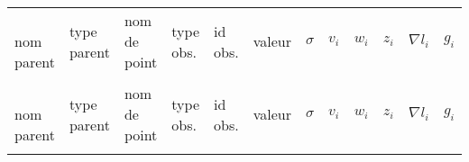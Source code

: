 \documentclass[a4paper, 9pt]{report}
\newenvironment{smalllongtable}{%
    \scriptsize %
    \ttfamily
    \begin{longtable}%
    }{
    \end{longtable}%
    }
\begin{document}
                                \begin{smalllongtable}{     
                                >{\raggedright}m{2.5cm}%
                                >{\raggedright}m{1cm}%
                                >{\raggedleft}m{2.0cm}%
                                >{\raggedleft}m{0.8cm}%
                                >{\raggedleft}m{0.8cm}%
                                >{\raggedleft}m{1.2cm}%
                                >{\raggedleft}m{0.8cm}%
                                >{\raggedleft}m{0.9cm}%
                                >{\raggedleft}m{0.8cm}%
                                >{\raggedleft}m{0.8cm}%
                                >{\raggedleft}m{1cm}%
                                >{\raggedleft\arraybackslash}m{1cm}}%
                                    
                                    \rowcolors{white} ~~ \normalfont nom parent & \normalfont type parent & \normalfont nom de point & \normalfont type obs. & \normalfont id obs. & \normalfont valeur & \normalfont $\sigma$ & \normalfont $v_i$ & \normalfont $w_i$ & \normalfont $z_i$ & \normalfont $\nabla l_i$ & \normalfont $g_i$ \\                         
                                    \rowcolors{white} & \normalfont & \normalfont & \normalfont & \normalfont [$+10^6$] & \normalfont [m] & \normalfont [mm] & \normalfont [mm] & \normalfont [-] & \normalfont [-] & \normalfont [mm] & \normalfont [mm] \\
                                    \hline
                                    \endfirsthead
                                    \rowcolors{white} ~~ \normalfont nom parent & \normalfont type parent & \normalfont nom de point & \normalfont type obs. & \normalfont id obs. & \normalfont valeur & \normalfont $\sigma$ & \normalfont $v_i$ & \normalfont $w_i$ & \normalfont $z_i$ & \normalfont $\nabla l_i$ & \normalfont $g_i$ \\                         
                                    \rowcolors{white} & \normalfont & \normalfont & \normalfont & \normalfont [$+10^6$] & \normalfont [m] & \normalfont [mm] & \normalfont [mm] & \normalfont [-] & \normalfont [-] & \normalfont [mm] & \normalfont [mm] \\
                                    \hline
                                    \endhead
                        

\end{smalllongtable}
\end{document}

